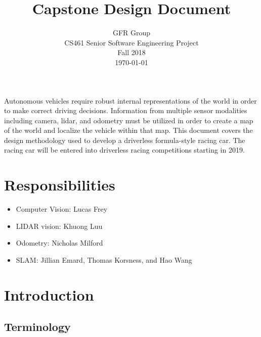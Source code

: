 \documentclass[10pt, onecolumn, draftclsnofoot, letterpaper,compsoc]{IEEEtran}
\title{Capstone Design Document}
\author{GFR Group \\
        CS461 Senior Software Engineering Project \\
        Fall 2018 \\
        \today}
\begin{document}
\maketitle

Autonomous vehicles require robust internal representations of the world in order to make correct driving decisions. Information from multiple sensor modalities including camera, lidar, and odometry must be utilized in order to create a map of the world and localize the vehicle within that map. This document covers the design methodology used to develop a driverless formula-style racing car. The racing car will be entered into driverless racing competitions starting in 2019.

\newpage
\tableofcontents
\newpage

\section{Responsibilities}
\begin{itemize}
    \item Computer Vision: Lucas Frey
    \item LIDAR vision: Khuong Luu
    \item Odometry: Nicholas Milford
    \item SLAM: Jillian Emard, Thomas Korsness, and Hao Wang
\end{itemize}
\section{Introduction}

\subsection{Terminology}
\end{document}
